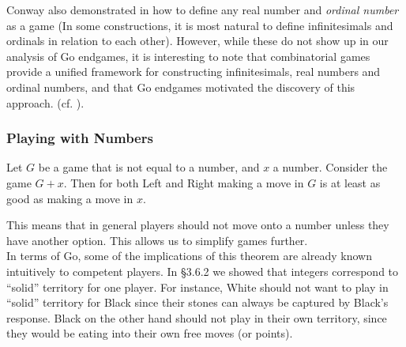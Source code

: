 \documentclass[../math194_paper.tex]{subfiles}
\begin{document}
Conway also demonstrated in \cite[\S 0]{conway2000numbers} how to define any real number 
and \textit{ordinal number}
as a game (In some constructions, it is most natural to define infinitesimals and 
ordinals in relation to each other). 
However, while these do not show up in our analysis of Go endgames, 
it is interesting to note that combinatorial games provide a unified
framework for constructing infinitesimals, real numbers and ordinal numbers,
and that Go endgames motivated the discovery of this approach. (cf. \cite[Prologue]{conway2000numbers}).

\subsubsection{Playing with Numbers}

\begin{theorem}
    \label{number_avoidance}
    Let $G$ be a game that is not equal to a number, and $x$ a number. Consider
    the game $G+x$. Then for both Left and Right making a move in $G$ is at 
    least as good as making a move in $x$.
\end{theorem}
    This means that in general players should not move onto a number unless 
    they have another option. This allows us to simplify games further. \\
    
    In terms of Go, some of the implications of this theorem are already known 
    intuitively to competent players. In \S 3.6.2 we showed that integers correspond
    to ``solid'' territory for one player. For instance, White should not want to 
    play in ``solid'' territory for Black since their stones can always be captured by
    Black's response. Black on the other hand should not play in their own territory, 
    since they would be eating into their own free moves (or points). 
\end{document}
